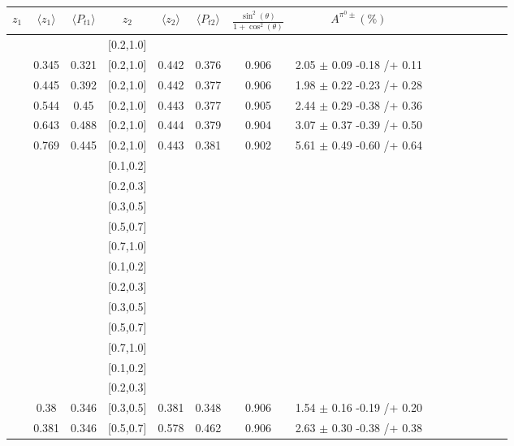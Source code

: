 \begin{table}[H]\scriptsize
\centering
\begin{tabular}{|c| c| c| c| c| c| c| c| c| c|c| c| c| c| c|}
\hline
$z_1$ & $\langle  z_1\rangle$ & $\langle  P_{t1} \rangle$ & $z_2$ & $\langle  z_2 \rangle$ & $\langle  P_{t2}  \rangle$& $\frac{\sin^2(\theta)}{1+\cos^2(\theta)}$ & $A^{\pi^0\pm}(\%)$  \\ \hline
[0.2,0.3]	&		&		&	[0.2,1.0]	&		&		&		&							\\ \hline
[0.3,0.4]	&	0.345	&	0.321	&	[0.2,1.0]	&	0.442	&	0.376	&	0.906	&	2.05	$\pm$	0.09	-0.18	/+	0.11	\\ \hline
[0.4,0.5]	&	0.445	&	0.392	&	[0.2,1.0]	&	0.442	&	0.377	&	0.906	&	1.98	$\pm$	0.22	-0.23	/+	0.28	\\ \hline
[0.5,0.6]	&	0.544	&	0.45	&	[0.2,1.0]	&	0.443	&	0.377	&	0.905	&	2.44	$\pm$	0.29	-0.38	/+	0.36	\\ \hline
[0.6,0.7]	&	0.643	&	0.488	&	[0.2,1.0]	&	0.444	&	0.379	&	0.904	&	3.07	$\pm$	0.37	-0.39	/+	0.50	\\ \hline
[0.7,1.0]	&	0.769	&	0.445	&	[0.2,1.0]	&	0.443	&	0.381	&	0.902	&	5.61	$\pm$	0.49	-0.60	/+	0.64	\\ \hline
[0.1,0.2]	&		&		&	[0.1,0.2]	&		&		&		&							\\ \hline
[0.1,0.2]	&		&		&	[0.2,0.3]	&		&		&		&							\\ \hline
[0.1,0.2]	&		&		&	[0.3,0.5]	&		&		&		&							\\ \hline
[0.1,0.2]	&		&		&	[0.5,0.7]	&		&		&		&							\\ \hline
[0.1,0.2]	&		&		&	[0.7,1.0]	&		&		&		&							\\ \hline
[0.2,0.3]	&		&		&	[0.1,0.2]	&		&		&		&							\\ \hline
[0.2,0.3]	&		&		&	[0.2,0.3]	&		&		&		&							\\ \hline
[0.2,0.3]	&		&		&	[0.3,0.5]	&		&		&		&							\\ \hline
[0.2,0.3]	&		&		&	[0.5,0.7]	&		&		&		&							\\ \hline
[0.2,0.3]	&		&		&	[0.7,1.0]	&		&		&		&							\\ \hline
[0.3,0.5]	&		&		&	[0.1,0.2]	&		&		&		&							\\ \hline
[0.3,0.5]	&		&		&	[0.2,0.3]	&		&		&		&							\\ \hline
[0.3,0.5]	&	0.38	&	0.346	&	[0.3,0.5]	&	0.381	&	0.348	&	0.906	&	1.54	$\pm$	0.16	-0.19	/+	0.20	\\ \hline
[0.3,0.5]	&	0.381	&	0.346	&	[0.5,0.7]	&	0.578	&	0.462	&	0.906	&	2.63	$\pm$	0.30	-0.38	/+	0.38	\\ \hline

\end{tabular}
\end{table}
